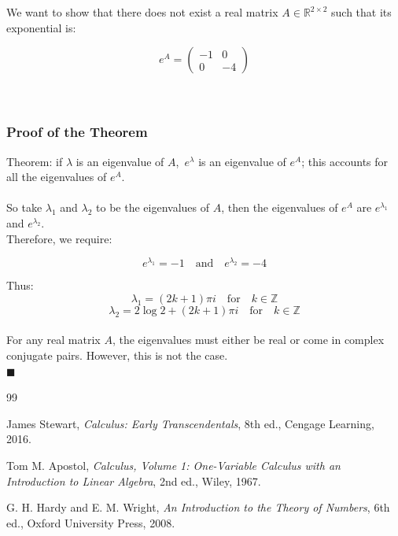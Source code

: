 \documentclass[12pt]{article}
\begin{document}
	
	
	We want to show that there does not exist a real matrix \( A \in \mathbb{R}^{2 \times 2} \) such that its exponential is:
	
	\[
	e^A = \begin{pmatrix} -1 & 0 \\ 0 & -4 \end{pmatrix}
	\]\\
	\\
	\subsubsection{Proof of the Theorem}
	Theorem:
	if $\lambda$ is an eigenvalue of $A$, $e^\lambda$ is an eigenvalue of $e^A$; this accounts for all the eigenvalues of $e^A$.\\
	\\
	So take \( \lambda_1 \) and \( \lambda_2 \) to be the eigenvalues of \( A \), then the eigenvalues of \( e^A \) are \( e^{\lambda_1} \) and \( e^{\lambda_2} \).\\
	Therefore, we require:
	
	\[
	e^{\lambda_1} = -1 \quad \text{and} \quad e^{\lambda_2} = -4
	\]
	
	
	Thus:
	\[
	\lambda_1 = (2k+1)\pi i \quad \text{for} \quad k \in \mathbb{Z}
	\]
	\[
	\lambda_2 = 2\log2 + (2k+1)\pi i \quad \text{for} \quad k \in \mathbb{Z}
	\]
	\\
	For any real matrix \( A \), the eigenvalues must either be real or come in complex conjugate pairs. However, this is not the case.
	\\
	\phantom{a}\hfill$\blacksquare$
	\newpage
	\begin{thebibliography}{99}
		
		James Stewart, 
		\emph{Calculus: Early Transcendentals}, 
		8th ed., Cengage Learning, 2016.
		
		Tom M. Apostol, 
		\emph{Calculus, Volume 1: One-Variable Calculus with an Introduction to Linear Algebra}, 
		2nd ed., Wiley, 1967.
		
		G. H. Hardy and E. M. Wright, 
		\emph{An Introduction to the Theory of Numbers}, 
		6th ed., Oxford University Press, 2008.
		
	\end{thebibliography}
	
\end{document}
